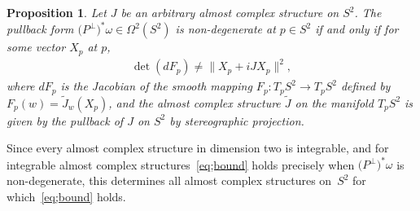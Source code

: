 \documentclass[pdftex]{sigma}
\newtheorem{prop}[thm]{Proposition}
{ \theoremstyle{definition} \newtheorem{defn}[thm]{Definition}
 \newtheorem{ex}[thm]{Example}
 \newtheorem{rmk}[thm]{Remark}}
\numberwithin{equation}{section}
\newcommand{\Om}{\Omega}
\begin{document}
\begin{prop} \label{prop;S2calc} Let $J$ be an arbitrary almost complex structure on $S^2$. The pullback form $\big(P^\perp\big)^*\omega \in \Om^2(S^2)$ is non-degenerate at $p \in S^2$ if and only if for some vector $X_p$ at $p$,
\begin{gather*}
\det(dF_p) \neq \|X_p + i JX_p\|^2,
\end{gather*}
where $dF_p$ is the Jacobian of the smooth mapping $F_p: T_pS^2 \to T_p S^2$ defined by $F_p(w) = \tilde J_w(X_p)$, and the almost complex structure $\tilde J$ on the manifold $T_pS^2$ is given by the pullback of $J$ on $S^2$ by stereographic projection.
\end{prop}

Since every almost complex structure in dimension two is integrable, and for integrable almost complex structures~\eqref{eq;bound} holds precisely when $\big(P^\perp\big)^*\omega$ is non-degenerate, this determines all almost complex structures on~$S^2$ for which~\eqref{eq;bound} holds.
\end{document}
